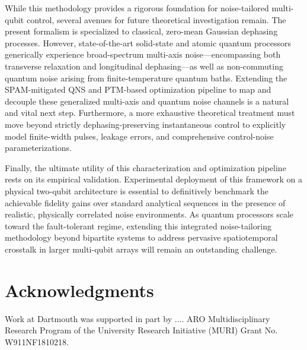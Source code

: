 \documentclass[%
 reprint,
superscriptaddress,
 amsmath,amssymb,
 aps,
pra,
floatfix,
]{revtex4-2}
\begin{document}
While this methodology provides a rigorous foundation for noise-tailored multi-qubit control, several avenues for future theoretical investigation remain. The present formalism is specialized to classical, zero-mean Gaussian dephasing processes. However, state-of-the-art solid-state and atomic quantum processors generically experience broad-spectrum multi-axis noise—encompassing both transverse relaxation and longitudinal dephasing—as well as non-commuting quantum noise arising from finite-temperature quantum baths. Extending the SPAM-mitigated QNS and PTM-based optimization pipeline to map and decouple these generalized multi-axis and quantum noise channels is a natural and vital next step. Furthermore, a more exhaustive theoretical treatment must move beyond strictly dephasing-preserving instantaneous control to explicitly model finite-width pulses, leakage errors, and comprehensive control-noise parameterizations.

Finally, the ultimate utility of this characterization and optimization pipeline rests on its empirical validation. Experimental deployment of this framework on a physical two-qubit architecture is essential to definitively benchmark the achievable fidelity gains over standard analytical sequences in the presence of realistic, physically correlated noise environments. As quantum processors scale toward the fault-tolerant regime, extending this integrated noise-tailoring methodology beyond bipartite systems to address pervasive spatiotemporal crosstalk in larger multi-qubit arrays will remain an outstanding challenge.

\smallskip

\section*{Acknowledgments} 

Work at Dartmouth was supported in part by .... ARO Multidisciplinary Research Program of the University Research Initiative (MURI) Grant No. W911NF1810218.


\end{document}
